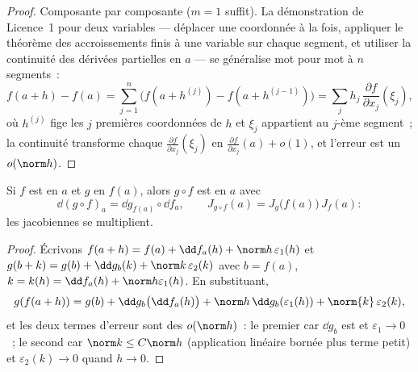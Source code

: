 \begin{proof}
Composante par composante ($m = 1$ suffit). La démonstration de
Licence~1 pour deux variables --- déplacer une coordonnée à la fois,
appliquer le théorème des accroissements finis à une variable sur
chaque segment, et utiliser la continuité des dérivées partielles en
$a$ --- se généralise mot pour mot à $n$ segments~:
\[
f(a + h) - f(a) = \sum_{j=1}^{n} \bigl(f(a + h^{(j)}) - f(a +
h^{(j-1)})\bigr)
= \sum_j h_j\,\frac{\partial f}{\partial x_j}(\xi_j),
\]
où $h^{(j)}$ fige les $j$ premières coordonnées de $h$ et
$\xi_j$ appartient au $j$-ème segment~; la continuité transforme chaque
$\frac{\partial f}{\partial x_j}(\xi_j)$ en $\frac{\partial
f}{\partial x_j}(a) + o(1)$, et l'erreur est un $o(\norm h)$.
\end{proof}

\begin{theorem}\label{thm:b2:diffcalc:chainrule}
Si $f$ est  en $a$ et $g$ en $f(a)$, alors $g \circ f$
est  en $a$ avec
\[
\dd(g \circ f)_a = \dd g_{f(a)} \circ \dd f_a ,
\qquad
J_{g\circ f}(a) = J_g\bigl(f(a)\bigr)\,J_f(a) :
\]
les jacobiennes se multiplient.
\end{theorem}

\begin{proof}
Écrivons $f(a + h) = f(a) + \dd f_a(h) + \norm h\,\varepsilon_1(h)$
et $g(b + k) = g(b) + \dd g_b(k) + \norm k\,\varepsilon_2(k)$ avec
$b = f(a)$, $k = k(h) = \dd f_a(h) + \norm h \varepsilon_1(h)$.
En substituant,
\[
g(f(a+h)) = g(b) + \dd g_b\bigl(\dd f_a(h)\bigr)
+ \norm h\,\dd g_b(\varepsilon_1(h)) + \norm{k}\,\varepsilon_2(k),
\]
et les deux termes d'erreur sont des $o(\norm h)$~: le premier car
$\dd g_b$ est  et $\varepsilon_1 \to 0$~; le second car
$\norm k \leq C\norm h$ (application linéaire bornée plus terme petit)
et $\varepsilon_2(k) \to 0$ quand $h \to 0$.
\end{proof}

